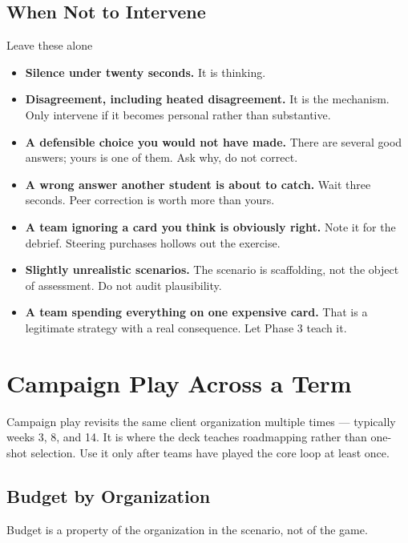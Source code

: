 \documentclass[11pt,letterpaper]{article}
\begin{document}
\subsection{When Not to Intervene}

\begin{hold}{Leave these alone}
\begin{itemize}
\item \textbf{Silence under twenty seconds.} It is thinking.
\item \textbf{Disagreement, including heated disagreement.} It is the mechanism.
Only intervene if it becomes personal rather than substantive.
\item \textbf{A defensible choice you would not have made.} There are several
good answers; yours is one of them. Ask why, do not correct.
\item \textbf{A wrong answer another student is about to catch.} Wait three
seconds. Peer correction is worth more than yours.
\item \textbf{A team ignoring a card you think is obviously right.} Note it for
the debrief. Steering purchases hollows out the exercise.
\item \textbf{Slightly unrealistic scenarios.} The scenario is scaffolding, not
the object of assessment. Do not audit plausibility.
\item \textbf{A team spending everything on one expensive card.} That is a
legitimate strategy with a real consequence. Let Phase 3 teach it.
\end{itemize}
\end{hold}

\section{Campaign Play Across a Term}
\label{sec:campaign-manual}

Campaign play revisits the same client organization multiple times --- typically
weeks 3, 8, and 14. It is where the deck teaches roadmapping rather than
one-shot selection. Use it only after teams have played the core loop at least
once.

\subsection{Budget by Organization}

Budget is a property of the organization in the scenario, not of the game.
\end{document}
